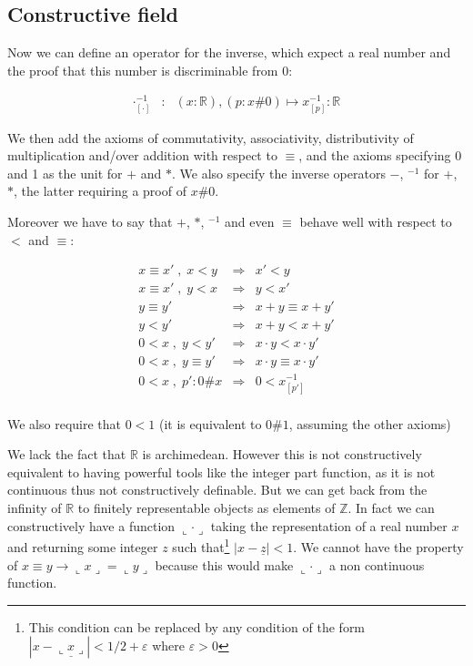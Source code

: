 \documentclass[a4paper,11pt]{article}
\newcommand{\R}{\mathbb{R}}
\newcommand{\Z}{\mathbb{Z}}
\theoremstyle{definition}
\theoremstyle{remark}
\begin{document}
\subsection{Constructive field}

Now we can define an operator for the inverse, which expect a real number and the
proof that this number is discriminable from 0:

  \[
  \begin{array}{ccl}
  \cdot^{-1}_{[\cdot]} & : & (x:\R), (p:x\#0) \mapsto x^{-1}_{[p]} : \R
  \end{array}
  \]

We then add the axioms of commutativity, associativity, distributivity of multiplication and/over
addition with respect to $≡$, and the axioms specifying 0 and 1 as the unit for $+$ and $*$. We also specify the inverse operators $-$, $^{-1}$ for $+$, $*$, the latter requiring a proof of $x\#0$.

Moreover we have to say that $+$, $*$, $^{-1}$ and even $≡$ behave well with respect to $<$ and $≡$:

  \[
  \begin{array}{rcl}
  x ≡ x' \;,\; x < y   &  \Rightarrow  & x' < y \\
  x ≡ x' \;,\; y < x   &  \Rightarrow  & y < x' \\
  y ≡ y'               &  \Rightarrow  & x + y ≡ x + y' \\
  y < y'                    &  \Rightarrow  & x + y < x + y' \\
  0 < x \;,\; y < y'        &  \Rightarrow  & x \cdot y < x \cdot y' \\
  0 < x \;,\; y ≡ y'   &  \Rightarrow  & x \cdot y ≡ x \cdot y' \\
  0<x \;,\;  p':0\#x      &  \Rightarrow  & 0 < x^{-1}_{[p']} \\
  \end{array}
  \]

We also require that $0<1$ (it is equivalent to $0\#1$, assuming the other axioms)

We lack the fact that $\R$ is archimedean. However this is not constructively equivalent to having powerful tools like the integer part function, as it is not continuous thus not constructively definable. But we can get back from the infinity of $\R$ to finitely representable objects as elements of $\Z$. In fact we can constructively have a function $\llcorner \cdot \lrcorner$ taking the representation of a real number $x$ and returning some integer $z$ such that\footnote{This condition can be replaced by any condition of the form $| x-\underline {\llcorner x \lrcorner} | < 1/2+\varepsilon$ where $\varepsilon>0$} $| x-\underline z | < 1$. We cannot have the property of $x≡y → \llcorner x \lrcorner=\llcorner y \lrcorner$ because this would make $\llcorner \cdot \lrcorner$ a non continuous function.
\end{document}
